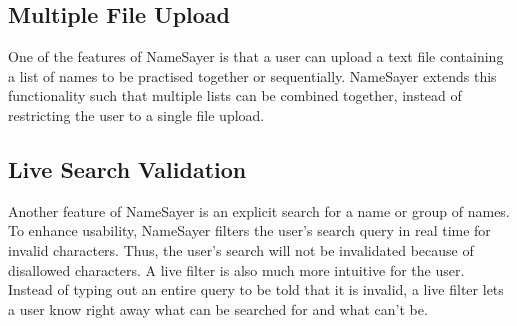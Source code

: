\documentclass{article}
\begin{document}
\subsection{Multiple File Upload}
One of the features of NameSayer is that a user can upload a text file
containing a list of names to be practised together or  sequentially. NameSayer
extends this functionality such that multiple lists can be combined together,
instead of restricting the user to a single file upload.

\subsection{Live Search Validation}
Another feature of NameSayer is an explicit search for a name or group of names.
To enhance usability, NameSayer filters  the user's search query in real time
for invalid characters. Thus, the user's search will not be invalidated because
of disallowed characters. A live filter is also much more intuitive for the
user. Instead of typing out an entire query to be told that it is invalid, a
live filter lets a user know right away what can be searched for and what can't
be.
\end{document}
